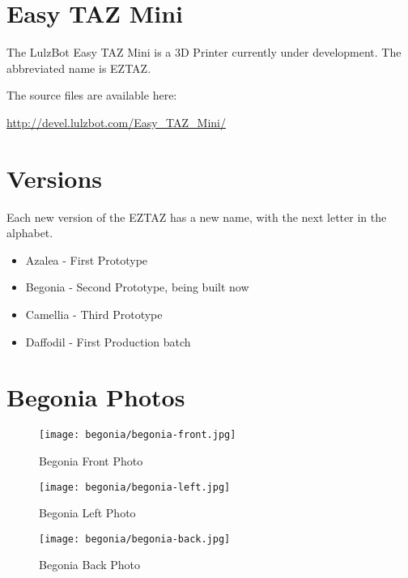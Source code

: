%
%
%
%
%

\section{Easy TAZ Mini}
The LulzBot Easy TAZ Mini is a 3D Printer currently under development. The
abbreviated name is EZTAZ.

The source files are available here:

\href{http://devel.lulzbot.com/Easy\_TAZ\_Mini/}{http://devel.lulzbot.com/Easy\_TAZ\_Mini/}

\section{Versions}
Each new version of the EZTAZ has a new name, with the next letter in the alphabet.

\begin{itemize}
  \item Azalea - First Prototype
  \item Begonia - Second Prototype, being built now
  \item Camellia - Third Prototype
  \item Daffodil - First Production batch
\end{itemize}

\section{Begonia Photos}

\begin{figure}[H]
\centering
\texttt{[image: begonia/begonia-front.jpg]}
\caption{Begonia Front Photo}
\label{fig:begfrontfoto}
\end{figure}

\begin{figure}[H]
\centering
\texttt{[image: begonia/begonia-left.jpg]}
\caption{Begonia Left Photo}
\label{fig:begleftfoto}
\end{figure}

\begin{figure}[H]
\centering
\texttt{[image: begonia/begonia-back.jpg]}
\caption{Begonia Back Photo}
\label{fig:begbackfoto}
\end{figure}


